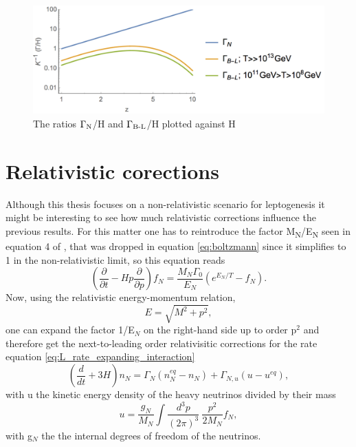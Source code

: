 \begin{figure}[H]
	\centering
	\includegraphics[width=0.8\linewidth]{Images/rates}
	\caption{The ratios $\Gamma\textsubscript{N}$/H and $\Gamma\textsubscript{B-L}$/H plotted against H}
	\label{fig:rates}
\end{figure}
\section{Relativistic corections}
Although this thesis focuses on a non-relativistic scenario for leptogenesis it might be interesting to see how much relativistic corrections influence the previous results. For this matter one has to reintroduce the factor M\textsubscript{N}/E\textsubscript{N} seen in equation 4 of \cite{Bodeker:2013qaa}, that was dropped in equation \eqref{eq:boltzmann} since it simplifies to 1 in the non-relativistic limit, so this equation reads
\begin{equation}
	\left(\frac{\partial}{\partial t}-Hp\frac{\partial}{\partial p}\right)f_N=\frac{M_N\Gamma_0}{E_N}\left(e^{E_N/T}-f_N\right).
	\label{eq:boltzmann_2}
\end{equation}
Now, using the relativistic energy-momentum relation,
\begin{equation}
	E=\sqrt{M^2+p^2},
	\label{eq:rel_energy_momentum}
\end{equation}
one can expand the factor 1/E$_N$ on the right-hand side up to order p$^2$ and therefore get the next-to-leading order relativisitic corrections for the rate equation \eqref{eq:L_rate_expanding_interaction}
\begin{equation}
\left(\frac{d}{dt}+3H\right)n_N=\Gamma_N\left(n_N^{eq}-n_N\right)+\Gamma_{N,u}\left(u-u^{eq}\right),
\label{eq:L_rate_expanding_interaction_rel}
\end{equation}
with u the kinetic energy density of the heavy neutrinos divided by their mass
\begin{equation}
	u=\frac{g_N}{M_N}\int\frac{d^3p}{(2\pi)^3}\:\frac{p^2}{2M_N}f_N,
	\label{eq:energy_density}
\end{equation}
with g$_N$ the the internal degrees of freedom of the neutrinos. \newline
